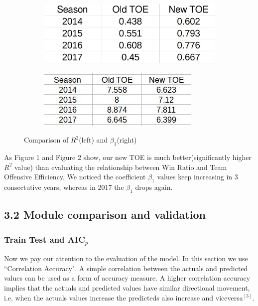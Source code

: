\documentclass[11pt]{article}
\begin{document}
\begin{figure}[h!]
\centering
 \begin{subfigure}[b]{0.4\linewidth}
  \includegraphics[width=\linewidth]{ComparisionR.jpg}
 \end{subfigure}
 \begin{subfigure}[b]{0.4\linewidth}
  \includegraphics[width =\linewidth]{Beta1.jpg}
\end{subfigure}
 \caption{Comparison of $R^2$(left) and $\beta_1$(right)}
\end{figure}

As Figure 1 and Figure 2 show, our new TOE is much better(significantly higher $R^2$ value) than evaluating the relationship between Win Ratio and Team Offensive Efficiency. We noticed the coefficient $\beta_1$ values keep increasing in 3 consectutive years, whereas in 2017 the $\beta_1$
drops again.

\newpage
\subsection*{3.2 Module comparison and validation}
\subsubsection*{Train Test and AIC$_p$}
Now we pay our attention to the evaluation of the model.
In this section we use ``Correlation Accuracy". A simple correlation between the actuals and predicted values can be used as a form of accuracy measure. A higher correlation accuracy implies that the actuals and predicted values have similar directional movement, i.e. when the actuals values increase the predicteds also increase and viceversa$^{[3]}$.
\end{document}
